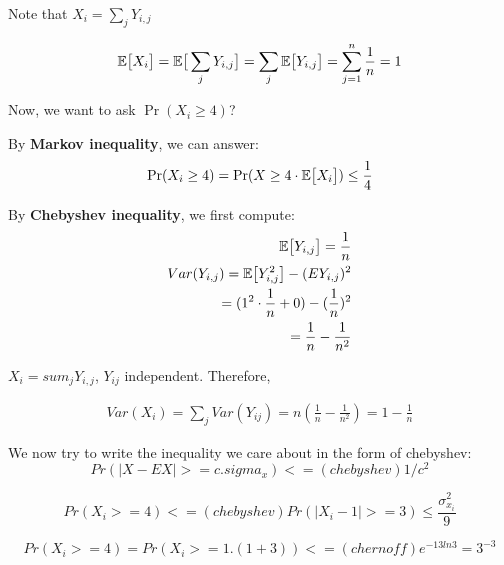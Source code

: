 Note that $X_i = \sum_j Y_{i,j}$

\begin{align*}
\mathbb{E}\big[ X_i \big] = \mathbb{E}\big[ \sum_j Y_{i, j} \big] = \sum_j \mathbb{E}\big[ Y_{i, j} \big] = \sum_{j=1}^n \frac{1}{n} = 1
\end{align*}


Now, we want to ask $\Pr(X_i \geq 4)$?


By \textbf{Markov inequality}, we can answer:
\begin{align*}
\Pr(X_i \geq 4) = \Pr(X \geq 4 \cdot \mathbb{E}\big[ X_i \big]) \leq \frac{1}{4}
\end{align*}



By \textbf{Chebyshev inequality}, we first compute:
\begin{align*}
\mathbb{E}\big[  Y_{i, j} \big] = \frac{1}{n} \\
Var(Y_{i, j}) = \mathbb{E}\big[ Y_{i, j}^2 \big] - (E{Y_{i, j}})^2 \\
= (1^2 \cdot \frac{1}{n} + 0) - (\frac{1}{n})^2 \\
= \frac{1}{n} - \frac{1}{n^2}
\end{align*}


$X_i = sum_j Y_{i, j}$, $Y_{ij}$ independent. Therefore,

\begin{align*}
Var(X_i) = \sum_j Var(Y_{ij}) = n (\frac{1}{n} - \frac{1}{n^2}) = 1 - \frac{1}{n}
\end{align*}

We now try to write the inequality we care about in the form of chebyshev:
$$
Pr(|X - EX| >= c . sigma_x) <=(chebyshev) 1/c^2
$$

$$
Pr(X_i >= 4) <=(chebyshev) Pr(|X_i - 1| >= 3) \leq \frac{\sigma_{x_i}^2}{9}
$$

$$
Pr (X_i >= 4) = Pr(X_i >= 1. (1 + 3)) <=(chernoff) e^{-1 3 ln 3} = 3^{-3}
$$

